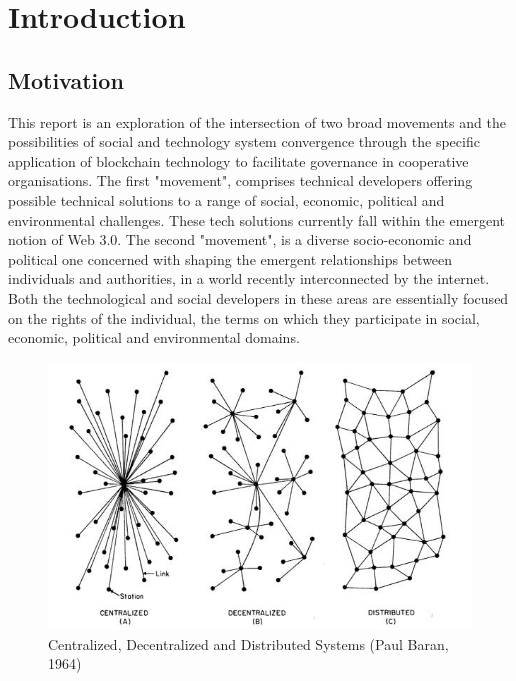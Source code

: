 
\chapter{Introduction} %

\label{Introduction} %



\section{Motivation}
This report is an exploration of the intersection of two broad movements and the possibilities of social and technology system \cite{Sociotechnology} convergence through the specific application of blockchain technology to facilitate governance in cooperative organisations. The first "movement", comprises technical developers offering possible technical solutions to a range of social, economic, political and environmental challenges. These tech solutions currently fall within the emergent notion of Web 3.0. The second "movement", is a diverse socio-economic and political one concerned with shaping the emergent relationships between individuals and authorities, in a world recently interconnected by the internet. Both the technological and social developers in these areas are essentially focused on the rights of the individual, the terms on which they participate in social, economic, political and environmental domains.\\

\begin{figure}
\centering
\includegraphics[width=\textwidth]{Figures/baran_net}
\decoRule
\caption[networks]{Centralized, Decentralized and Distributed Systems (Paul Baran, 1964)}
\label{fig:Electron}
\end{figure}

